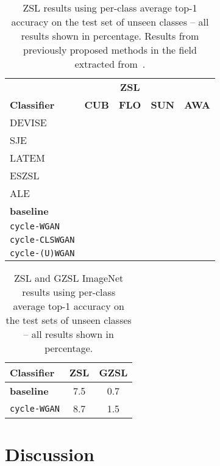\documentclass[runningheads]{llncs}
\begin{document}
\begin{table}
\centering
\caption{ZSL results using per-class average top-1 accuracy on the test set of unseen classes  -- all results shown in percentage. Results from previously proposed methods in the field extracted from~\cite{XianCVPR2017}.}
\label{table:zsl_results}
\centering
\begin{tabular}{l|c|c|c|c}
\hline
& & \textbf{ZSL} &
\\
\textbf{Classifier}  
& \textbf{CUB} 
& \textbf{FLO} 
& \textbf{SUN}
& \textbf{AWA }
\\ \hline
DEVISE~\cite{frome2013devise}          &  &  &  &  \\
SJE~\cite{akata2015evaluation}         &  &  &  &  \\
LATEM~\cite{xian2016latent}            &  &  &  &  \\
ESZSL~\cite{romera2015embarrassingly}  &  &  &  &  \\
ALE~\cite{akata2016label}              &  &  &  & 
\\ \hline

\textbf{baseline} \cite{XianCVPR2018} 

&  &  &  & 
\\

\texttt{cycle-WGAN} 
&  &  &  & 
\\

\texttt{cycle-CLSWGAN} 
&  &  &  & 
 \\
 
\texttt{cycle-(U)WGAN} 
&  &   &  & 
 \\ \hline
 
 \end{tabular}
\end{table} 

\begin{table}
\centering
\caption{ZSL and GZSL ImageNet results using per-class average top-1 accuracy on the test sets of unseen classes  -- all results shown in percentage.}
\label{table:zsl_imagenet}
\centering
\begin{tabular}{lcc}
\hline
\textbf{Classifier}  & \textbf{ZSL} & \textbf{GZSL}
\\ 
\hline
\textbf{baseline}~\cite{XianCVPR2018} & 7.5 & 0.7 \\
\texttt{cycle-WGAN}  & 8.7 & 1.5\\
\hline
\end{tabular}
\end{table}



\section{Discussion}
\label{sec:discussion}
\end{document}
